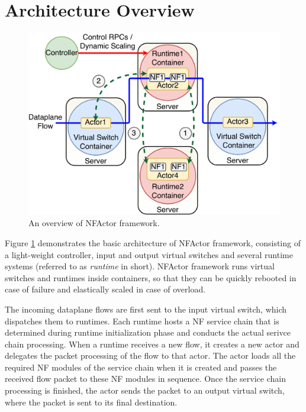 \section {Architecture Overview}

\begin{figure}[!t]
  \centering
  \includegraphics[width=\columnwidth]{figure/final-final-nfactor-cluster.pdf}
  \caption{An overview of NFActor framework.}
  \label{fig:runtime}
\end{figure}

Figure \ref{fig:runtime} demonstrates the basic architecture of NFActor framework, consisting of a light-weight controller, input and output virtual switches and several runtime systems (referred to as \textit{runtime} in short). NFActor framework runs virtual switches and runtimes inside containers, so that they can be quickly rebooted in case of failure and elastically scaled in case of overload.

The incoming dataplane flows are first sent to the input virtual switch, which dispatches them to runtimes. Each runtime hosts a NF service chain that is determined during runtime initialization phase and conducts the actual serivce chain processing. When a runtime receives a new flow, it creates a new actor and delegates the packet processing of the flow to that actor. The actor loads all the required NF modules of the service chain when it is created and passes the received flow packet to these NF modules in sequence. Once the service chain processing is finished, the actor sends the packet to an output virtual switch, where the packet is sent to its final destination.

